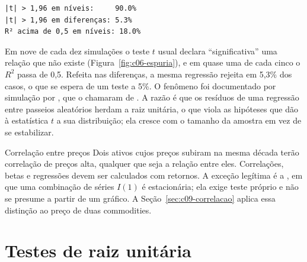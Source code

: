 

\Needspace{18mm}
\begin{lstlisting}[style=saida]
|t| > 1,96 em níveis:     90.0%
|t| > 1,96 em diferenças: 5.3%
R² acima de 0,5 em níveis: 18.0%
\end{lstlisting}

Em nove de cada dez simulações o teste $t$ usual declara ``significativa'' uma relação que não existe (Figura~\ref{fig:c06-espuria}), e em quase uma de cada cinco o $R^2$ passa de 0,5. Refeita nas diferenças, a mesma regressão rejeita em 5,3\% dos casos, o que se espera de um teste a 5\%. O fenômeno foi documentado por simulação por \citet{granger1974}, que o chamaram de . A razão é que os resíduos de uma regressão entre passeios aleatórios herdam a raiz unitária, o que viola as hipóteses que dão à estatística $t$ a sua distribuição; ela cresce com o tamanho da amostra em vez de se estabilizar.

\begin{armadilha}{Correlação entre preços}
Dois ativos cujos preços subiram na mesma década terão correlação de preços alta, qualquer que seja a relação entre eles. Correlações, betas e regressões devem ser calculados com retornos. A exceção legítima é a , em que uma combinação de séries $I(1)$ é estacionária; ela exige teste próprio e não se presume a partir de um gráfico. A Seção~\ref{sec:c09-correlacao} aplica essa distinção ao preço de duas commodities.
\end{armadilha}


\section{Testes de raiz unitária}
\label{sec:c06-adf}


